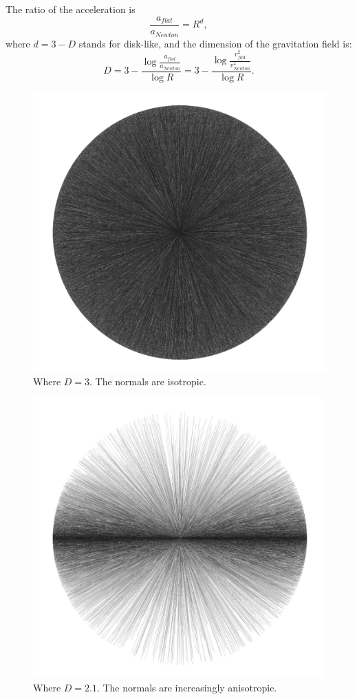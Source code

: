 \documentclass[12pt]{article}
\begin{document}
The ratio of the acceleration is
\begin{equation}
\frac{a_{\textit{flat}}}{a_{\textit{Newton}}} = R^{d}, 
\end{equation}
where $d = 3 - D$ stands for disk-like, and the dimension of the gravitation field is:
\begin{equation}
D = 3 - \frac{\log \frac{a_{\textit{flat}}}{a_{\textit{Newton}}}}{\log R} = 3 - \frac{\log \frac{v_{\textit{flat}}^2}{v_{\textit{Newton}}^2}}{\log R}.
\end{equation}




\begin{figure} 
\centering
\label{fig1}
  \includegraphics[width = 3 in]{3.png}
  \caption{
Where $D = 3$.
The normals are isotropic.
}
\end{figure}

\begin{figure} 
\centering
\label{fig2}
  \includegraphics[width = 3 in]{2.1.png}
  \caption{
Where $D = 2.1$.
The normals are increasingly anisotropic.
}
\end{figure}
\end{document}
